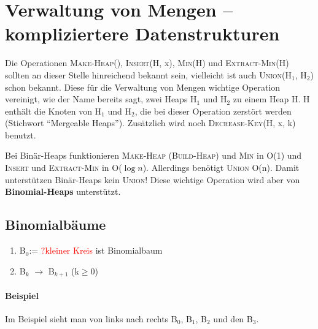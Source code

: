 \chapter{Verwaltung von Mengen -- kompliziertere Datenstrukturen}
Die Operationen \textsc{Make-Heap}(), \textsc{Insert}(H, x), \textsc{Min}(H) und \textsc{Extract-Min}(H) sollten an dieser Stelle
hinreichend bekannt sein, vielleicht ist auch \textsc{Union}(H$_1$, H$_2$) schon bekan\-nt. Diese für die Verwaltung von Mengen wichtige
Operation vereinigt, wie der Name bereits sagt, zwei Heaps H$_1$ und H$_2$ zu einem Heap H. H enthält die Knoten von H$_1$ und H$_2$,
die bei dieser Operation zerstört werden (Stichwort "`Mergeable Heaps"'). Zusätzlich wird noch \textsc{Decrease-Key}(H, x, k) benutzt.

Bei Binär-Heaps funktionieren \textsc{Make-Heap} (\textsc{Build-Heap}) und \textsc{Min} in O(1) und \textsc{Insert} und
\textsc{Extract-Min} in O($\log n$). Allerdings benötigt \textsc{Union} O(n). Damit unter\-stützen Binär-Heaps kein \textsc{Union}!
Diese wichtige Operation wird aber von \textbf{Binomial-Heaps} unterstützt.

\section{Binomialbäume}
\begin{definition}[Binomialbäume]
\begin{enumerate}
\item B$_0$:= \textcolor{red}{?kleiner Kreis} ist Binomialbaum
\item B$_k$ $\rightarrow$ B$_{k+1}$ (k$\geq$0)
  \begin{figure}[H]
  \centering
   
  
  \end{figure}
\end{enumerate}
\end{definition}
\subsubsection{Beispiel}
\begin{figure}[H]
  \centering
   
  
  \end{figure}
  Im Beispiel sieht man von links nach rechts B$_0$, B$_1$, B$_2$ und den B$_3$.

